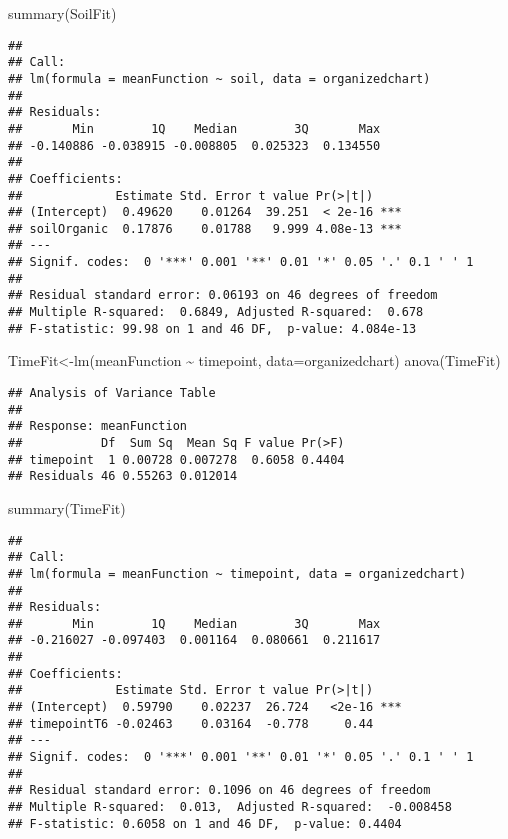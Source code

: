 \documentclass[
]{article}
\newenvironment{Shaded}{\begin{snugshade}}{\end{snugshade}}
\newcommand{\AttributeTok}[1]{\textcolor[rgb]{0.77,0.63,0.00}{#1}}
\newcommand{\FunctionTok}[1]{\textcolor[rgb]{0.00,0.00,0.00}{#1}}
\newcommand{\NormalTok}[1]{#1}
\newcommand{\OtherTok}[1]{\textcolor[rgb]{0.56,0.35,0.01}{#1}}
\newcommand{\SpecialCharTok}[1]{\textcolor[rgb]{0.00,0.00,0.00}{#1}}
\begin{document}
\begin{Shaded}
\begin{Highlighting}[]
\FunctionTok{summary}\NormalTok{(SoilFit)}
\end{Highlighting}
\end{Shaded}

\begin{verbatim}
## 
## Call:
## lm(formula = meanFunction ~ soil, data = organizedchart)
## 
## Residuals:
##       Min        1Q    Median        3Q       Max 
## -0.140886 -0.038915 -0.008805  0.025323  0.134550 
## 
## Coefficients:
##             Estimate Std. Error t value Pr(>|t|)    
## (Intercept)  0.49620    0.01264  39.251  < 2e-16 ***
## soilOrganic  0.17876    0.01788   9.999 4.08e-13 ***
## ---
## Signif. codes:  0 '***' 0.001 '**' 0.01 '*' 0.05 '.' 0.1 ' ' 1
## 
## Residual standard error: 0.06193 on 46 degrees of freedom
## Multiple R-squared:  0.6849, Adjusted R-squared:  0.678 
## F-statistic: 99.98 on 1 and 46 DF,  p-value: 4.084e-13
\end{verbatim}

\begin{Shaded}
\begin{Highlighting}[]
\NormalTok{TimeFit}\OtherTok{\textless{}{-}}\FunctionTok{lm}\NormalTok{(meanFunction }\SpecialCharTok{\textasciitilde{}}\NormalTok{ timepoint, }\AttributeTok{data=}\NormalTok{organizedchart)}
\FunctionTok{anova}\NormalTok{(TimeFit)}
\end{Highlighting}
\end{Shaded}

\begin{verbatim}
## Analysis of Variance Table
## 
## Response: meanFunction
##           Df  Sum Sq  Mean Sq F value Pr(>F)
## timepoint  1 0.00728 0.007278  0.6058 0.4404
## Residuals 46 0.55263 0.012014
\end{verbatim}

\begin{Shaded}
\begin{Highlighting}[]
\FunctionTok{summary}\NormalTok{(TimeFit)}
\end{Highlighting}
\end{Shaded}

\begin{verbatim}
## 
## Call:
## lm(formula = meanFunction ~ timepoint, data = organizedchart)
## 
## Residuals:
##       Min        1Q    Median        3Q       Max 
## -0.216027 -0.097403  0.001164  0.080661  0.211617 
## 
## Coefficients:
##             Estimate Std. Error t value Pr(>|t|)    
## (Intercept)  0.59790    0.02237  26.724   <2e-16 ***
## timepointT6 -0.02463    0.03164  -0.778     0.44    
## ---
## Signif. codes:  0 '***' 0.001 '**' 0.01 '*' 0.05 '.' 0.1 ' ' 1
## 
## Residual standard error: 0.1096 on 46 degrees of freedom
## Multiple R-squared:  0.013,  Adjusted R-squared:  -0.008458 
## F-statistic: 0.6058 on 1 and 46 DF,  p-value: 0.4404
\end{verbatim}
\end{document}
